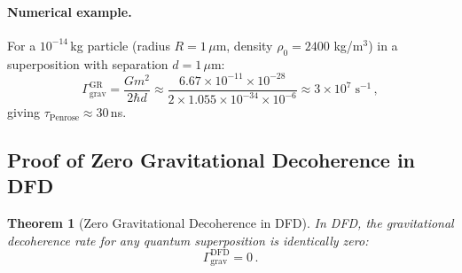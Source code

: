 \documentclass[aps,prl,twocolumn,superscriptaddress,nofootinbib,longbibliography]{revtex4-2}
\newtheorem{theorem}{Theorem}
\begin{document}
\paragraph{Numerical example.} For a $10^{-14}$\,kg particle
(radius $R = 1\,\mu$m, density $\rho_0 = 2400$ kg/m$^3$) in a
superposition with separation $d = 1\,\mu$m:
\begin{equation}
\Gamma_{\text{grav}}^{\text{GR}} = \frac{Gm^2}{2\hbar d}
\approx \frac{6.67\times10^{-11}\times10^{-28}}
{2\times1.055\times10^{-34}\times10^{-6}}
\approx 3\times10^7\;\text{s}^{-1}\,,
\end{equation}
giving $\tau_{\text{Penrose}} \approx 30$\,ns.

\subsection{Proof of Zero Gravitational Decoherence in DFD}

\begin{theorem}[Zero Gravitational Decoherence in DFD]
\label{thm:zero-decoherence}
In DFD, the gravitational decoherence rate for any quantum
superposition is identically zero:
\begin{equation}
\Gamma_{\text{grav}}^{\text{DFD}} = 0\,.
\end{equation}
\end{theorem}
\end{document}
